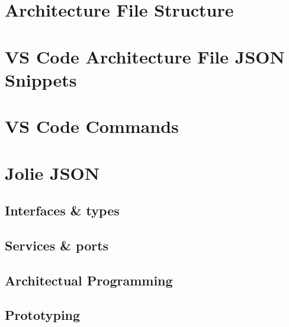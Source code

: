 \appendixpage
\noappendicestocpagenum
\addappheadtotoc
\chapter{Architecture File Structure}
\label{appen:architecture-file-structure}


\chapter{VS Code Architecture File JSON Snippets}
\label{appen:vscode_snippets}


\chapter{VS Code Commands}
\label{appen:vscode_commands}


\chapter{Jolie JSON}
\section{Interfaces \& types}
\label{appen:joliejson_iface_types}


\section{Services \& ports}
\label{appen:joliejson_services}


\clearpage
\section{Architectual Programming}
\label{appen:joliejson_architecture}


\section{Prototyping}
\label{appen:joliejson_prototype}
